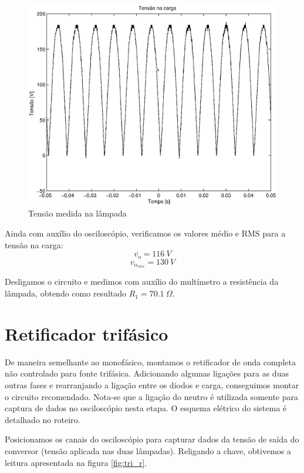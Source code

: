 \documentclass{report}
\begin{document}
\begin{figure}[H]
	\centering
	\includegraphics[width=\linewidth]{dados/monofasico/mono_r}
	\caption{Tensão medida na lâmpada}
	\label{fig:mono_r}
\end{figure}

Ainda com auxílio do osciloscópio, verificamos os valores médio e RMS para a tensão na carga:
\begin{equation}
\overline{v_o} = 116\ V
\end{equation}
\begin{equation}
v_{o_{rms}} = 130\ V
\end{equation}

Desligamos o circuito e medimos com auxílio do multímetro a resistência da lâmpada, obtendo como resultado $R_1=70.1\ \Omega$.

\section{Retificador trifásico}
De maneira semelhante ao monofásico, montamos o retificador de onda completa não controlado para fonte trifásica. Adicionando algumas ligações para as duas outras fases e rearranjando a ligação entre os diodos e carga, conseguimos montar o circuito recomendado. Nota-se que a ligação do neutro é utilizada somente para captura de dados no osciloscópio nesta etapa. O esquema elétrico do sistema é detalhado no roteiro.

Posicionamos os canais do osciloscópio para capturar dados da tensão de saída do conversor (tensão aplicada nas duas lâmpadas). Religando a chave, obtivemos a leitura apresentada na figura \ref{fig:tri_r}. 
\end{document}
